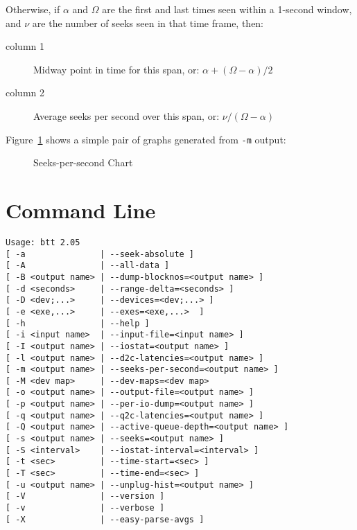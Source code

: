 \documentclass{article}
\begin{document}
  Otherwise, if $\alpha$ and $\Omega$ are the first and last times
  seen within a 1-second window, and $\nu$ are the number of seeks seen
  in that time frame, then:

  \begin{description}
    \item[column 1] Midway point in time for this span, or: \hfill$\alpha +
    {{(\Omega - \alpha)} / 2}$

    \item[column 2] Average seeks per second over this span, or: \hfill$\nu  /
    {(\Omega - \alpha)}$
  \end{description}

  Figure~\ref{fig:sps} shows a simple pair of graphs generated from
  \texttt{-m} output:

  \begin{figure}[h!]
  \leavevmode\centering
  \caption{\label{fig:sps}Seeks-per-second Chart}
  \end{figure}
  \FloatBarrier

\newpage\section{\label{sec:cmd-line}Command Line}

\begin{verbatim}
Usage: btt 2.05 
[ -a               | --seek-absolute ]
[ -A               | --all-data ]
[ -B <output name> | --dump-blocknos=<output name> ]
[ -d <seconds>     | --range-delta=<seconds> ]
[ -D <dev;...>     | --devices=<dev;...> ]
[ -e <exe,...>     | --exes=<exe,...>  ]
[ -h               | --help ]
[ -i <input name>  | --input-file=<input name> ]
[ -I <output name> | --iostat=<output name> ]
[ -l <output name> | --d2c-latencies=<output name> ]
[ -m <output name> | --seeks-per-second=<output name> ]
[ -M <dev map>     | --dev-maps=<dev map>
[ -o <output name> | --output-file=<output name> ]
[ -p <output name> | --per-io-dump=<output name> ]
[ -q <output name> | --q2c-latencies=<output name> ]
[ -Q <output name> | --active-queue-depth=<output name> ]
[ -s <output name> | --seeks=<output name> ]
[ -S <interval>    | --iostat-interval=<interval> ]
[ -t <sec>         | --time-start=<sec> ]
[ -T <sec>         | --time-end=<sec> ]
[ -u <output name> | --unplug-hist=<output name> ]
[ -V               | --version ]
[ -v               | --verbose ]
[ -X               | --easy-parse-avgs ]
\end{verbatim}
\end{document}
